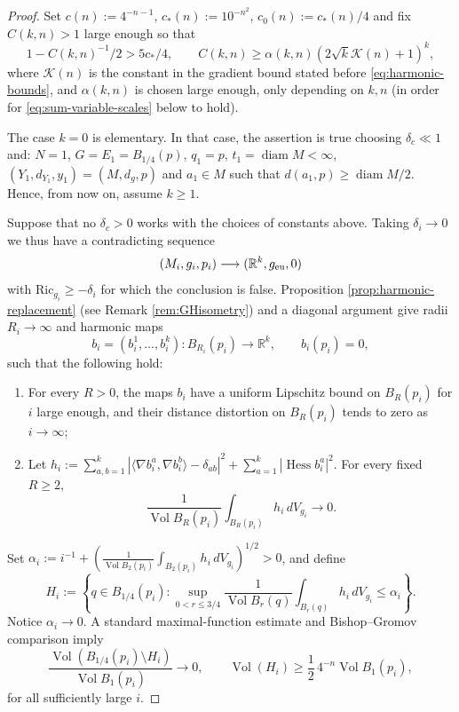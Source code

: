 \documentclass[11pt]{amsart}
\theoremstyle{definition}
\theoremstyle{remark}
\DeclareMathOperator{\Hess}{Hess}
\DeclareMathOperator{\Vol}{Vol}
\DeclareMathOperator{\diam}{diam}
\newcommand{\R}{\mathbb R}
\begin{document}
\begin{proof}
Set $c(n):=4^{-n-1}$, $c_*(n):=10^{-n^2}$, $c_0(n):=c_*(n)/4$ and fix $C(k,n)>1$ large enough so that
\begin{equation}\label{eqn:CLarge}
1-C(k,n)^{-1}/2>5c_*/4, \qquad C(k,n)\geq \alpha(k,n)(2\sqrt{k}\mathcal{K}(n)+1)^k,
\end{equation}
where $\mathcal{K}(n)$ is the constant in the gradient bound stated before \eqref{eq:harmonic-bounds}, and $\alpha(k,n)$ is chosen large enough, only depending on $k,n$ (in order for \eqref{eq:sum-variable-scales} below to hold).

The case $k=0$ is elementary. In that case, the assertion is true choosing $\delta_c\ll 1$ and: $N=1$, $G=E_1=B_{1/4}(p)$, $q_1=p$, $t_1=\diam M<\infty$, $(Y_1,d_{Y_1},y_1)=(M,d_g,p)$ and $a_1\in M$ such that $d(a_1,p)\geq \diam M/2$. Hence, from now on, assume $k\geq 1$. 

Suppose that
no $\delta_c>0$ works with the choices of constants above. Taking $\delta_i\to 0$
we thus have a contradicting sequence
\[
        (M_i,g_i,p_i)\longrightarrow(\R^k,g_{\rm eu},0)
\]
with $\mathrm{Ric}_{g_i}\geq -\delta_i$ for which the conclusion is false. 
Proposition
\ref{prop:harmonic-replacement} (see Remark \ref{rem:GHisometry}) and a
diagonal argument give radii $R_i\to\infty$ and harmonic maps
\[
 b_i=(b_i^1,\ldots,b_i^k):B_{R_i}(p_i)\longrightarrow\mathbb R^k,
 \qquad b_i(p_i)=0,
\]
such that the following hold:
\begin{enumerate}[label=\textup{(\alph*)},leftmargin=2.3em]
\item For every $R>0$, the maps $b_i$ have a uniform Lipschitz bound on $B_{R}(p_i)$ for $i$ large enough, and their distance distortion on $B_{R}(p_i)$ tends to
zero as $i\to \infty$;
\item Let  $h_i:=\sum_{a,b=1}^k
 \left|\langle\nabla b_i^a,\nabla b_i^b\rangle-\delta_{ab}\right|^2
       +\sum_{a=1}^k|\Hess b_i^a|^2$. For every fixed $R\geq 2$,
\[
\frac{1}{\Vol B_R(p_i)}\int_{B_R(p_i)}h_i\,dV_{g_i}\longrightarrow0.
\]
\end{enumerate}
Set $
 \alpha_i:=i^{-1}+
 \left(\frac1{\Vol B_2(p_i)}\int_{B_2(p_i)}h_i\,dV_{g_i}\right)^{1/2}>0$, and define
\[
 H_i:=\left\{q\in B_{1/4}(p_i):
       \sup_{0<r\leq3/4}\frac{1}{\Vol B_r(q)}\int_{B_r(q)}h_i\,dV_{g_i}
       \leq\alpha_i\right\}.
\]
Notice $\alpha_i\to 0$. A standard maximal-function estimate and Bishop--Gromov comparison imply
\begin{equation}\label{eq:Hi-large}
 \frac{\Vol(B_{1/4}(p_i)\setminus H_i)}{\Vol B_1(p_i)}\longrightarrow0,
 \qquad
 \Vol(H_i)\geq\frac12\,4^{-n}\Vol B_1(p_i),
\end{equation}
for all sufficiently large $i$.


\end{proof}
\end{document}
